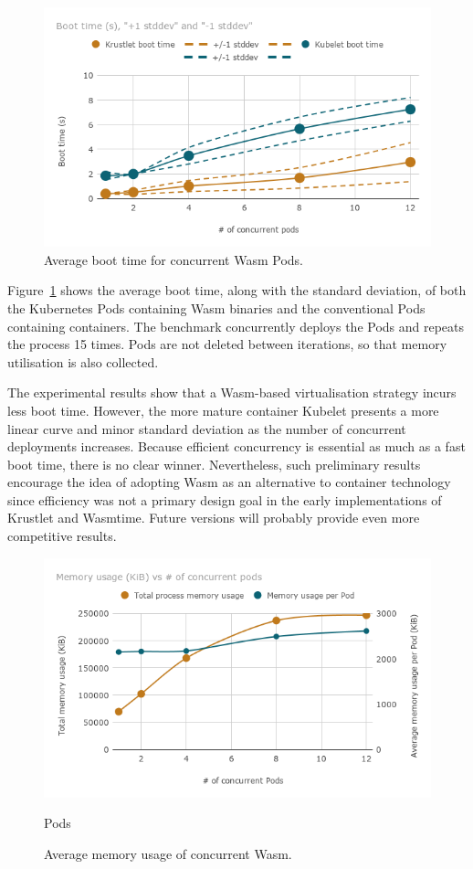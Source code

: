 \begin{figure}[ht]
\centering
\includegraphics[width=\columnwidth]{figures/b-krustlet-1}
\caption{Average boot time for concurrent Wasm Pods.}
\label{fig:b-krustlet-1}
\end{figure}

Figure~\ref{fig:b-krustlet-1} shows the average boot time, along with the standard deviation, of both the Kubernetes Pods containing Wasm binaries and the conventional Pods containing containers. The benchmark concurrently deploys the Pods and repeats the process 15 times. Pods are not deleted between iterations, so that memory utilisation is also collected.

The experimental results show that a Wasm-based virtualisation strategy incurs less boot time. However, the more mature container Kubelet presents a more linear curve and minor standard deviation as the number of concurrent deployments increases. Because efficient concurrency is essential as much as a fast boot time, there is no clear winner. Nevertheless, such preliminary results encourage the idea of adopting Wasm as an alternative to container technology since efficiency was not a primary design goal in the early implementations of Krustlet and Wasmtime. Future versions will probably provide even more competitive results.

\begin{figure}[ht]
\centering
\includegraphics[width=\columnwidth]{figures/b-krustlet-2}
\caption{Average memory usage of concurrent Wasm.}
Pods \label{fig:b-krustlet-2}
\end{figure}

